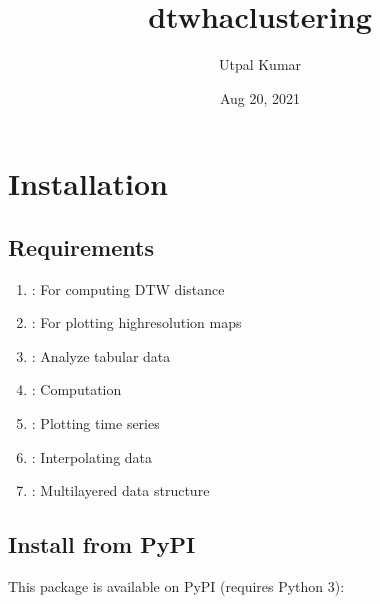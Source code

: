 \documentclass[letterpaper,10pt,english]{sphinxmanual}
\title{dtwhaclustering}
\date{Aug 20, 2021}
\author{Utpal Kumar}
\begin{document}
\pagestyle{empty}
\sphinxmaketitle
\pagestyle{plain}
\sphinxtableofcontents
\pagestyle{normal}
\label{\detokenize{index::doc}}



\chapter{Installation}
\label{\detokenize{usage/install:installation}}\label{\detokenize{usage/install::doc}}

\section{Requirements}
\label{\detokenize{usage/install:requirements}}\begin{enumerate}
%
\item {} 
\sphinxAtStartPar
{}: For computing DTW distance

\item {} 
\sphinxAtStartPar
{}: For plotting high\sphinxhyphen{}resolution maps

\item {} 
\sphinxAtStartPar
{}: Analyze tabular data

\item {} 
\sphinxAtStartPar
{}: Computation

\item {} 
\sphinxAtStartPar
{}: Plotting time series

\item {} 
\sphinxAtStartPar
{}: Interpolating data

\item {} 
\sphinxAtStartPar
{}: Multilayered data structure

\end{enumerate}


\section{Install from PyPI}
\label{\detokenize{usage/install:install-from-pypi}}
\sphinxAtStartPar
This package is available on PyPI (requires Python 3):

\begin{sphinxVerbatim}[commandchars=\\\{\}]
  
\end{sphinxVerbatim}
\label{\detokenize{modules/module_contents:module-dtwhaclustering}}
\end{document}
